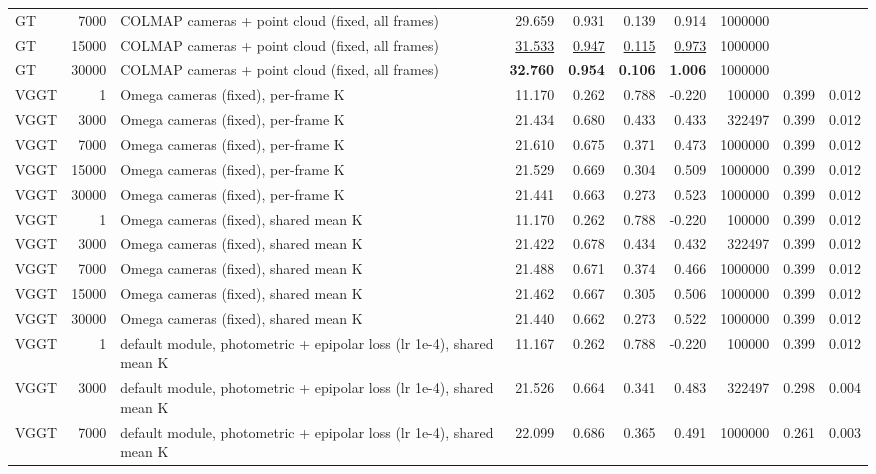 \begin{table}[H]
\begin{tabular}{lrlrrrrrrr}
GT & 7000 & COLMAP cameras + point cloud (fixed, all frames) & 29.659 & 0.931 & 0.139 & 0.914 & 1000000 &  &  \\
GT & 15000 & COLMAP cameras + point cloud (fixed, all frames) & \underline{31.533} & \underline{0.947} & \underline{0.115} & \underline{0.973} & 1000000 &  &  \\
GT & 30000 & COLMAP cameras + point cloud (fixed, all frames) & \textbf{32.760} & \textbf{0.954} & \textbf{0.106} & \textbf{1.006} & 1000000 &  &  \\
VGGT & 1 & Omega cameras (fixed), per-frame K & 11.170 & 0.262 & 0.788 & -0.220 & 100000 & 0.399 & 0.012 \\
VGGT & 3000 & Omega cameras (fixed), per-frame K & 21.434 & 0.680 & 0.433 & 0.433 & 322497 & 0.399 & 0.012 \\
VGGT & 7000 & Omega cameras (fixed), per-frame K & 21.610 & 0.675 & 0.371 & 0.473 & 1000000 & 0.399 & 0.012 \\
VGGT & 15000 & Omega cameras (fixed), per-frame K & 21.529 & 0.669 & 0.304 & 0.509 & 1000000 & 0.399 & 0.012 \\
VGGT & 30000 & Omega cameras (fixed), per-frame K & 21.441 & 0.663 & 0.273 & 0.523 & 1000000 & 0.399 & 0.012 \\
VGGT & 1 & Omega cameras (fixed), shared mean K & 11.170 & 0.262 & 0.788 & -0.220 & 100000 & 0.399 & 0.012 \\
VGGT & 3000 & Omega cameras (fixed), shared mean K & 21.422 & 0.678 & 0.434 & 0.432 & 322497 & 0.399 & 0.012 \\
VGGT & 7000 & Omega cameras (fixed), shared mean K & 21.488 & 0.671 & 0.374 & 0.466 & 1000000 & 0.399 & 0.012 \\
VGGT & 15000 & Omega cameras (fixed), shared mean K & 21.462 & 0.667 & 0.305 & 0.506 & 1000000 & 0.399 & 0.012 \\
VGGT & 30000 & Omega cameras (fixed), shared mean K & 21.440 & 0.662 & 0.273 & 0.522 & 1000000 & 0.399 & 0.012 \\
VGGT & 1 & default module, photometric + epipolar loss (lr 1e-4), shared mean K & 11.167 & 0.262 & 0.788 & -0.220 & 100000 & 0.399 & 0.012 \\
VGGT & 3000 & default module, photometric + epipolar loss (lr 1e-4), shared mean K & 21.526 & 0.664 & 0.341 & 0.483 & 322497 & 0.298 & 0.004 \\
VGGT & 7000 & default module, photometric + epipolar loss (lr 1e-4), shared mean K & 22.099 & 0.686 & 0.365 & 0.491 & 1000000 & 0.261 & 0.003 \\

\end{tabular}
\end{table}
